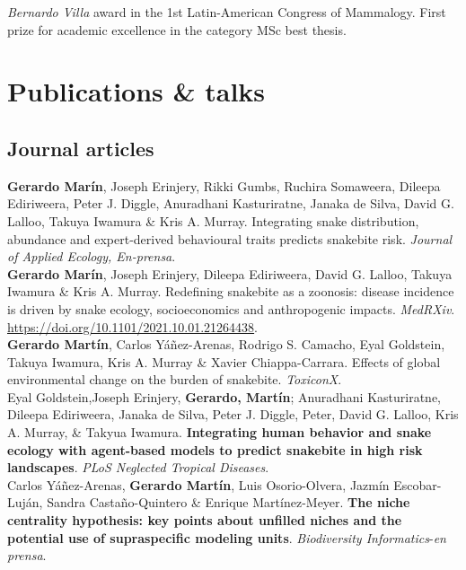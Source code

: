 \documentclass[12pt, a4paper]{article}
\newcommand{\years}[1]{\marginnote{\scriptsize #1}}
\begin{document}
\years{2010} \emph{Bernardo Villa} award in the 1st Latin-American Congress of Mammalogy. First prize for academic excellence in the category MSc best thesis.\\

\section*{Publications \& talks}

\subsection*{Journal articles}
\noindent 

\years{2021} \textbf{Gerardo Mar\'in}, Joseph Erinjery, Rikki Gumbs, Ruchira Somaweera, Dileepa Ediriweera, Peter J. Diggle, Anuradhani Kasturiratne, Janaka de Silva, David G. Lalloo, Takuya Iwamura \& Kris A. Murray. Integrating snake distribution, abundance and expert-derived behavioural traits predicts snakebite risk. \emph{Journal of Applied Ecology, En-prensa}.\\

\years{2021} \textbf{Gerardo Mar\'in}, Joseph Erinjery, Dileepa Ediriweera, David G. Lalloo, Takuya Iwamura \& Kris A. Murray. Redefining snakebite as a zoonosis: disease incidence is driven by snake ecology, socioeconomics and anthropogenic impacts. \emph{MedRXiv}. \url{https://doi.org/10.1101/2021.10.01.21264438}.\\

\years{2021} \textbf{Gerardo Martín}, Carlos Y\'a\~nez-Arenas, Rodrigo S. Camacho, Eyal Goldstein, Takuya Iwamura, Kris A. Murray \& Xavier Chiappa-Carrara. Effects of global environmental change on the burden of snakebite. \emph{ToxiconX}.\\

\years{2021} Eyal Goldstein,Joseph Erinjery, \textbf{Gerardo, Mart\'in}; Anuradhani Kasturiratne, Dileepa Ediriweera, Janaka de Silva, Peter J. Diggle, Peter, David G. Lalloo, Kris A. Murray, \& Takyua Iwamura. \textbf{Integrating human behavior and snake ecology with agent-based models to predict snakebite in high risk landscapes}. \emph{PLoS Neglected Tropical Diseases}.\\

\years{2020} Carlos Y\'a\~nez-Arenas, \textbf{Gerardo Mart\'in}, Luis Osorio-Olvera, Jazm\'in Escobar-Luj\'an, Sandra Casta\~no-Quintero \& Enrique Mart\'inez-Meyer. \textbf{The niche centrality hypothesis: key points about unfilled niches and the potential use of supraspecific modeling units}. \emph{Biodiversity Informatics}-\emph{en prensa}.\\
\end{document}
